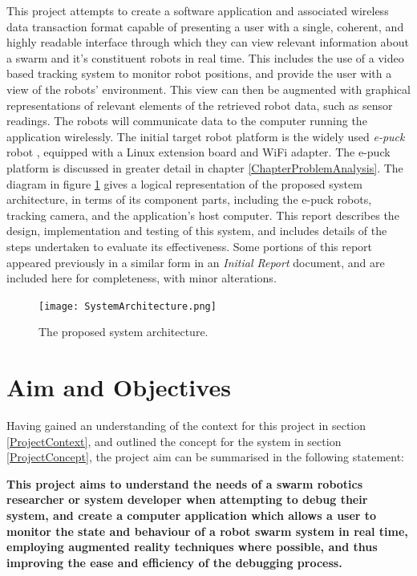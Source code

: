 This project attempts to create a software application and associated wireless data transaction format capable of presenting a user with a single, coherent, and highly readable interface through which they can view relevant information about a swarm and it's constituent robots in real time. This includes the use of a video based tracking system to monitor robot positions, and provide the user with a view of the robots' environment. This view can then be augmented with graphical representations of relevant elements of the retrieved robot data, such as sensor readings. The robots will communicate data to the computer running the application wirelessly. The initial target robot platform is the widely used \textit{e-puck} robot \cite{epuck}, equipped with a Linux extension board and WiFi adapter. The e-puck platform is discussed in greater detail in chapter \ref{ChapterProblemAnalysis}. The diagram in figure \ref{fig:SystemArchitecture} gives a logical representation of the proposed system architecture, in terms of its component parts, including the e-puck robots, tracking camera, and the application's host computer. This report describes the design, implementation and testing of this system, and includes details of the steps undertaken to evaluate its effectiveness. Some portions of this report appeared previously in a similar form in an \textit{Initial Report} document, and are included here for completeness, with minor alterations.

\begin{figure}
	\begin{center}
	\texttt{[image: SystemArchitecture.png]}
	\decoRule
	\caption[Proposed System Architecture]{The proposed system architecture.}
	\label{fig:SystemArchitecture}
	\end{center}
\end{figure}


\section{Aim and Objectives} \label{AimAndObjectives}
Having gained an understanding of the context for this project in section \ref{ProjectContext}, and outlined the concept for the system in section \ref{ProjectConcept}, the project aim can be summarised in the following statement: 

\noindent\textbf{This project aims to understand the needs of a swarm robotics researcher or system developer when attempting to debug their system, and create a computer application which allows a user to monitor the state and behaviour of a robot swarm system in real time, employing augmented reality techniques where possible, and thus improving the ease and efficiency of the debugging process.}

